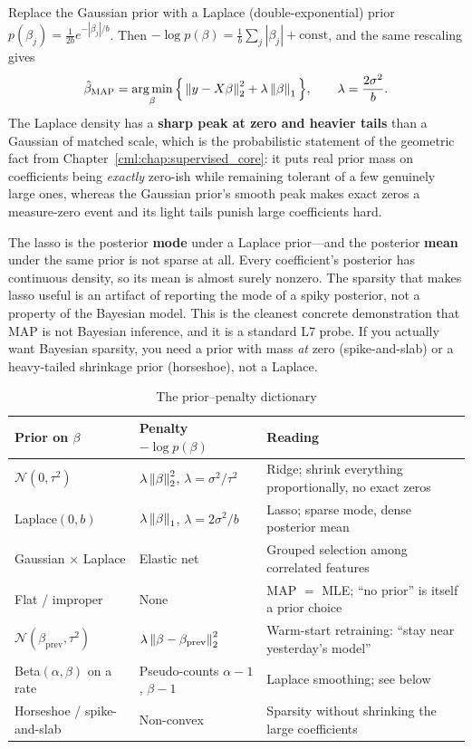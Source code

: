 Replace the Gaussian prior with a Laplace (double-exponential) prior $p(\beta_j) = \frac{1}{2b}e^{-|\beta_j|/b}$. Then $-\log p(\beta) = \frac{1}{b}\sum_j |\beta_j| + \text{const}$, and the same rescaling gives
\begin{equation}
\hat\beta_{\text{MAP}} = \operatorname*{arg\,min}_\beta \Big\{ \left\lVert y - X\beta\right\rVert_2^2 + \lambda \left\lVert\beta\right\rVert_1 \Big\}, \qquad \lambda = \frac{2\sigma^2}{b} .
\end{equation}
The Laplace density has a \textbf{sharp peak at zero and heavier tails} than a Gaussian of matched scale, which is the probabilistic statement of the geometric fact from Chapter~\ref{cml:chap:supervised_core}: it puts real prior mass on coefficients being \textit{exactly} zero-ish while remaining tolerant of a few genuinely large ones, whereas the Gaussian prior's smooth peak makes exact zeros a measure-zero event and its light tails punish large coefficients hard.

\begin{warningbox}
The lasso is the posterior \textbf{mode} under a Laplace prior---and the posterior \textbf{mean} under the same prior is not sparse at all. Every coefficient's posterior has continuous density, so its mean is almost surely nonzero. The sparsity that makes lasso useful is an artifact of reporting the mode of a spiky posterior, not a property of the Bayesian model. This is the cleanest concrete demonstration that MAP is not Bayesian inference, and it is a standard L7 probe. If you actually want Bayesian sparsity, you need a prior with mass \textit{at} zero (spike-and-slab) or a heavy-tailed shrinkage prior (horseshoe), not a Laplace.
\end{warningbox}

\begin{table}[H]
\centering
\small
\caption{The prior--penalty dictionary}
\label{cml:tab:prior_penalty}
\begin{tabularx}{\textwidth}{llX}
\toprule
\textbf{Prior on $\beta$} & \textbf{Penalty $-\log p(\beta)$} & \textbf{Reading} \\
\midrule
$\mathcal{N}(0,\tau^2)$ & $\lambda\left\lVert\beta\right\rVert_2^2$, $\lambda = \sigma^2/\tau^2$ & Ridge; shrink everything proportionally, no exact zeros \\
Laplace$(0,b)$ & $\lambda\left\lVert\beta\right\rVert_1$, $\lambda = 2\sigma^2/b$ & Lasso; sparse mode, dense posterior mean \\
Gaussian $\times$ Laplace & Elastic net & Grouped selection among correlated features \\
Flat / improper & None & MAP $=$ MLE; ``no prior'' is itself a prior choice \\
$\mathcal{N}(\beta_{\text{prev}}, \tau^2)$ & $\lambda\left\lVert\beta - \beta_{\text{prev}}\right\rVert_2^2$ & Warm-start retraining: ``stay near yesterday's model'' \\
Beta$(\alpha,\beta)$ on a rate & Pseudo-counts $\alpha-1$, $\beta-1$ & Laplace smoothing; see below \\
Horseshoe / spike-and-slab & Non-convex & Sparsity without shrinking the large coefficients \\
\bottomrule
\end{tabularx}
\end{table}

